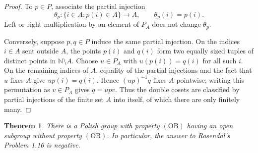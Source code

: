 \documentclass[11pt]{article}
\newtheorem{theorem}{Theorem}
\newcommand{\N}{\mathbb N}
\newcommand{\OB}{\mathrm{OB}}
\begin{document}
\begin{proof}
To $p\in P$, associate the partial injection
\[
 \theta_p:\{i\in A:p(i)\in A\}\longrightarrow A,\qquad \theta_p(i)=p(i).
\]
Left or right multiplication by an element of $P_A$ does not change
$\theta_p$.

Conversely, suppose $p,q\in P$ induce the same partial injection.  On the
indices $i\in A$ sent outside $A$, the points $p(i)$ and $q(i)$ form two
equally sized tuples of distinct points in $\N\setminus A$.  Choose
$u\in P_A$ with $u(p(i))=q(i)$ for all such $i$.  On the remaining indices
of $A$, equality of the partial injections and the fact that $u$ fixes $A$
give $up(i)=q(i)$.  Hence $(up)^{-1}q$ fixes $A$ pointwise; writing this
permutation as $v\in P_A$ gives $q=upv$.  Thus the double cosets are
classified by partial injections of the finite set $A$ into itself, of which
there are only finitely many.
\end{proof}

\begin{theorem}\label{thm:counterexample}
There is a Polish group with property $(\OB)$ having an open subgroup without
property $(\OB)$.  In particular, the answer to Rosendal's Problem 1.16 is
negative.
\end{theorem}
\end{document}
